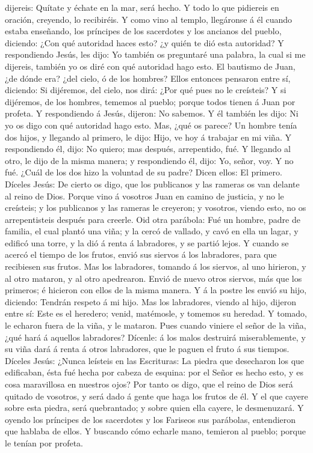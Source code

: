 dijereis: Quítate y échate en la mar, será hecho.  Y todo
lo que pidiereis en oración, creyendo, lo recibiréis.  Y
como vino al templo, llegáronse á él cuando estaba enseñando, los
príncipes de los sacerdotes y los ancianos del pueblo, diciendo: ¿Con
qué autoridad haces esto? ¿y quién te dió esta autoridad? 
Y respondiendo Jesús, les dijo: Yo también os preguntaré una palabra, la
cual si me dijereis, también yo os diré con qué autoridad hago esto.
 El bautismo de Juan, ¿de dónde era? ¿del cielo, ó de los
hombres? Ellos entonces pensaron entre sí, diciendo: Si dijéremos, del
cielo, nos dirá: ¿Por qué pues no le creísteis?  Y si
dijéremos, de los hombres, tememos al pueblo; porque todos tienen á Juan
por profeta.  Y respondiendo á Jesús, dijeron: No sabemos.
Y él también les dijo: Ni yo os digo con qué autoridad hago esto.
 Mas, ¿qué os parece? Un hombre tenía dos hijos, y llegando
al primero, le dijo: Hijo, ve hoy á trabajar en mi viña.  Y
respondiendo él, dijo: No quiero; mas después, arrepentido, fué.
 Y llegando al otro, le dijo de la misma manera; y
respondiendo él, dijo: Yo, señor, voy. Y no fué.  ¿Cuál de
los dos hizo la voluntad de su padre? Dicen ellos: El primero. Díceles
Jesús: De cierto os digo, que los publicanos y las rameras os van
delante al reino de Dios.  Porque vino á vosotros Juan en
camino de justicia, y no le creísteis; y los publicanos y las rameras le
creyeron; y vosotros, viendo esto, no os arrepentisteis después para
creerle.  Oid otra parábola: Fué un hombre, padre de
familia, el cual plantó una viña; y la cercó de vallado, y cavó en ella
un lagar, y edificó una torre, y la dió á renta á labradores, y se
partió lejos.  Y cuando se acercó el tiempo de los frutos,
envió sus siervos á los labradores, para que recibiesen sus frutos.
 Mas los labradores, tomando á los siervos, al uno
hirieron, y al otro mataron, y al otro apedrearon.  Envió
de nuevo otros siervos, más que los primeros; é hicieron con ellos de la
misma manera.  Y á la postre les envió su hijo, diciendo:
Tendrán respeto á mi hijo.  Mas los labradores, viendo al
hijo, dijeron entre sí: Este es el heredero; venid, matémosle, y tomemos
su heredad.  Y tomado, le echaron fuera de la viña, y le
mataron.  Pues cuando viniere el señor de la viña, ¿qué
hará á aquellos labradores?  Dícenle: á los malos destruirá
miserablemente, y su viña dará á renta á otros labradores, que le paguen
el fruto á sus tiempos.  Díceles Jesús: ¿Nunca leísteis en
las Escrituras: La piedra que desecharon los que edificaban, ésta fué
hecha por cabeza de esquina: por el Señor es hecho esto, y es cosa
maravillosa en nuestros ojos?  Por tanto os digo, que el
reino de Dios será quitado de vosotros, y será dado á gente que haga los
frutos de él.  Y el que cayere sobre esta piedra, será
quebrantado; y sobre quien ella cayere, le desmenuzará.  Y
oyendo los príncipes de los sacerdotes y los Fariseos sus parábolas,
entendieron que hablaba de ellos.  Y buscando cómo echarle
mano, temieron al pueblo; porque le tenían por profeta.


